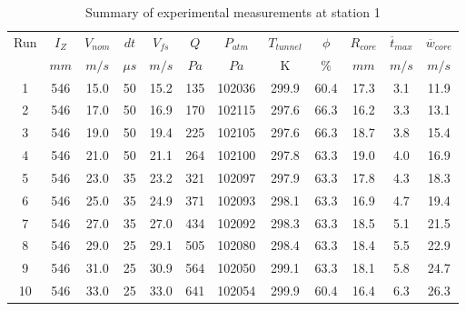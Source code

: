 \begin{table}[H]
\begin{center}
\begin{tabular}{|cccccccccccc|}
	\hline
	Run & $I_Z$ & $V_{nom}$ & $dt$ & $V_{fs}$ & $Q$ & $P_{atm}$ & $T_{tunnel}$ & $\phi$ & $R_{core}$ & $\overline{t}_{max}$ & $\overline{w}_{core}$\\
	  & $mm$ & $m/s$ & $\mu s$ & $m/s$ & $Pa$ & $Pa$ & K & $\%$ & $mm$ & $m/s$ & $m/s$\\
	\hline
	1 & 546 & 15.0 & 50 & 15.2 & 135 & 102036 & 299.9 & 60.4 & 17.3 & 3.1 & 11.9\\
	2 & 546 & 17.0 & 50 & 16.9 & 170 & 102115 & 297.6 & 66.3 & 16.2 & 3.3 & 13.1\\
	3 & 546 & 19.0 & 50 & 19.4 & 225 & 102105 & 297.6 & 66.3 & 18.7 & 3.8 & 15.4\\
	4 & 546 & 21.0 & 50 & 21.1 & 264 & 102100 & 297.8 & 63.3 & 19.0 & 4.0 & 16.9\\
	5 & 546 & 23.0 & 35 & 23.2 & 321 & 102097 & 297.9 & 63.3 & 17.8 & 4.3 & 18.3\\
	6 & 546 & 25.0 & 35 & 24.9 & 371 & 102093 & 298.1 & 63.3 & 16.9 & 4.7 & 19.4\\
	7 & 546 & 27.0 & 35 & 27.0 & 434 & 102092 & 298.3 & 63.3 & 18.5 & 5.1 & 21.5\\
	8 & 546 & 29.0 & 25 & 29.1 & 505 & 102080 & 298.4 & 63.3 & 18.4 & 5.5 & 22.9\\
	9 & 546 & 31.0 & 25 & 30.9 & 564 & 102050 & 299.1 & 63.3 & 18.1 & 5.8 & 24.7\\
	10 & 546 & 33.0 & 25 & 33.0 & 641 & 102054 & 299.9 & 60.4 & 16.4 & 6.3 & 26.3\\
	\hline
\end{tabular}
\caption{Summary of experimental measurements at station 1}
\label{table:experiment_results_1}
\end{center}
\end{table}
